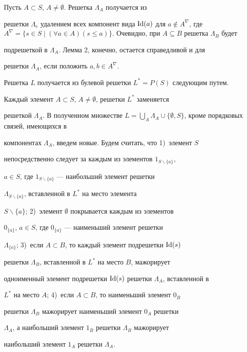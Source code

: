 Пусть $A\subset S$, $A\ne\emptyset$. Решетка $\Lambda_A$ получается из


решетки $\Lambda_e$ удалением всех компонент вида $\Id(a)$ для $a\notin


A^\nabla$, где $A^\nabla=\{s\in S\mid (\forall a\in A)(s\leqslant


a)\}$. Очевидно, при $A\subseteq B$ решетка $\Lambda_B$ будет


подрешеткой в $\Lambda_A$. Лемма 2, конечно, остается справедливой и для


решетки $\Lambda_A$, если положить $a,b\in A^\nabla$.





Решетка $L$ получается из булевой решетки $L^*=P(S)$ следующим путем.


Каждый элемент $A\subset S$, $A\ne\emptyset$, решетки $L^*$ заменяется


решеткой $\Lambda_A$. В полученном множестве $L=\bigcup\limits_A


\Lambda_A\cup\{\emptyset,S\}$, кроме порядковых связей, имеющихся в


компонентах $\Lambda_A$, введем новые. Будем считать, что 1)~элемент $S$


непосредственно следует за каждым из элементов $1_{S\backslash \{a\}}$,


$a\in S$, где $1_{S\backslash\{a\}}$ --- наибольший элемент решетки


$\Lambda_{S\backslash\{a\}}$, вставленной в $L^*$ на место элемента


$S\backslash\{a\}$; 2)~элемент $\emptyset$ покрывается каждым из элементов


$0_{\{a\}}$, $a\in S$, где $0_{\{a\}}$ --- наименьший элемент решетки


$\Lambda_{\{a\}}$; 3)~если $A\subset B$, то каждый элемент подрешетки $\operatorname{Id}(s)$


решетки $\Lambda_B$, вставленной в $L^*$ на место $B$, мажорирует


одноименный элемент подрешетки $\operatorname{Id}(s)$ решетки $\Lambda_A$, вставленной в


$L^*$ на место $A$; 4)~если $A\subset B$, то наименьший элемент $0_B$


решетки $\Lambda_B$ мажорирует наименьший элемент $0_A$ решетки


$\Lambda_A$, а наибольший элемент $1_B$ решетки $\Lambda_B$ мажорирует


наибольший элемент $1_A$ решетки $\Lambda_A$.





